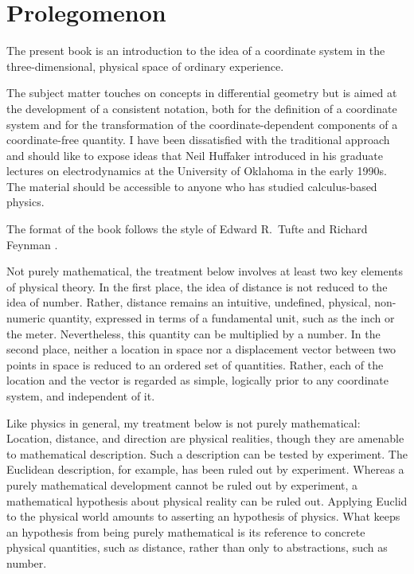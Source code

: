 \cleardoublepage
\chapter*{Prolegomenon}

The present book is an introduction to the idea of a coordinate system in the
three-dimensional, physical space of ordinary experience.

The subject matter touches on concepts in differential geometry but is aimed at
the development of a consistent notation, both for the definition of a
coordinate system and for the transformation of the coordinate-dependent
components of a coordinate-free quantity.  I have been dissatisfied with the
traditional approach and should like to expose ideas that Neil Huffaker
introduced in his graduate lectures on electrodynamics at the University of
Oklahoma in the early 1990s.  The material should be accessible to anyone who
has studied calculus-based physics.

The format of the book follows the style of Edward R.~Tufte and Richard
Feynman \citep{pkg-tufte}.

Not purely mathematical, the treatment below involves at least two key elements
of physical theory.  In the first place, the idea of distance is not reduced to
the idea of number.  Rather, distance remains an intuitive, undefined,
physical, non-numeric quantity, expressed in terms of a fundamental unit, such
as the inch or the meter.  Nevertheless, this quantity can be multiplied by a
number.  In the second place, neither a location in space nor a displacement
vector between two points in space is reduced to an ordered set of quantities.
Rather, each of the location and the vector is regarded as simple, logically
prior to any coordinate system, and independent of it.

Like physics in general, my treatment below is not purely mathematical:
Location, distance, and direction are physical realities, though they are
amenable to mathematical description.  Such a description can be tested by
experiment.  The Euclidean description, for example, has been ruled out by
experiment.
Whereas a purely mathematical development cannot be ruled out by experiment, a
mathematical hypothesis about physical reality can be ruled out.  Applying
Euclid to the physical world amounts to asserting an hypothesis of physics.
What keeps an hypothesis from being purely mathematical is its reference to
concrete physical quantities, such as distance, rather than only to
abstractions, such as number.

